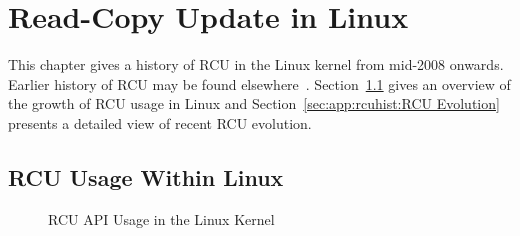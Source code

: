 
\chapter{Read-Copy Update in Linux}
\label{app:rcuhist:Read-Copy Update in Linux}

This chapter gives a history of RCU in the Linux kernel from mid-2008
onwards.
Earlier history of RCU may be found
elsewhere~\cite{PaulEdwardMcKenneyPhD,PaulEMcKenney2008RCUOSR}.
Section~\ref{sec:app:rcuhist:RCU Usage Within Linux}
gives an overview of the growth of RCU usage in Linux and
Section~\ref{sec:app:rcuhist:RCU Evolution}
presents a detailed view of recent RCU evolution.

\section{RCU Usage Within Linux}
\label{sec:app:rcuhist:RCU Usage Within Linux}

\begin{figure}[bp]
\begin{center}
\end{center}
\caption{RCU API Usage in the Linux Kernel}
\label{fig:app:rcuhist:RCU API Usage in the Linux Kernel}
\end{figure}

